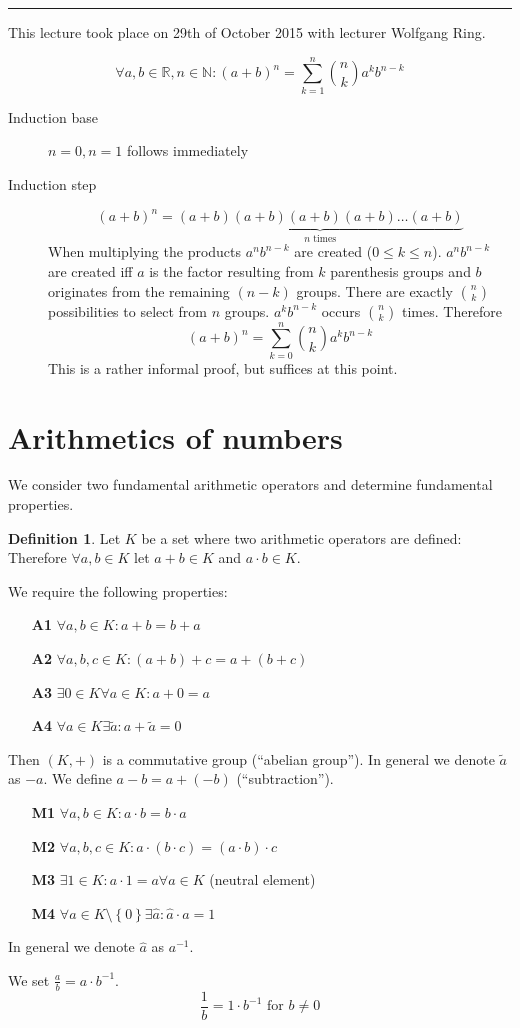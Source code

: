 \documentclass[a4paper,landscape,twocolumn]{article}
\theoremstyle{definition}
\newtheorem{defi}{Definition}
\newcommand\set[1]{\left\{#1\right\}}
\newcommand\meta[3]{\hrule{} This #1 took place on #2 with lecturer #3.\par}
\begin{document}
\meta{lecture}{29th of October 2015}{Wolfgang Ring}

\[ \forall a, b \in \mathbb{R}, n \in \mathbb{N}: (a + b)^n = \sum_{k=1}^n \binom{n}{k} a^k b^{n-k}  \]
\begin{description}
  \item[Induction base] $n = 0, n = 1$ follows immediately
  \item[Induction step]
    \[ (a + b)^n = \underbrace{(a + b)(a + b)(a + b)(a + b)\dots(a + b)}_{n \text{ times}} \]
    When multiplying the products $a^n b^{n-k}$ are created ($0 \leq k \leq n$).
    $a^n b^{n-k}$ are created iff $a$ is the factor resulting from $k$ parenthesis groups and
    $b$ originates from the remaining $(n-k)$ groups.
    There are exactly $\binom{n}{k}$ possibilities to select from $n$ groups.
    $a^k b^{n-k}$ occurs $\binom nk$ times.
    Therefore
    \[ (a + b)^n = \sum_{k=0}^n \binom nk a^k b^{n-k} \]
    This is a rather informal proof, but suffices at this point.
\end{description}

\section{Arithmetics of numbers}
%
We consider two fundamental arithmetic operators and determine fundamental properties.

\begin{defi}
  Let $K$ be a set where two arithmetic operators are defined:
  Therefore $\forall a,b \in K$ let $a + b \in K$ and $a \cdot b \in K$.

  We require the following properties:
  \begin{itemize}
    \item[\textbf{A1}] $\forall a,b \in K: a + b = b + a$
    \item[\textbf{A2}] $\forall a,b,c \in K: (a + b) + c = a + (b + c)$
    \item[\textbf{A3}] $\exists 0 \in K \forall a \in K: a + 0 = a$
    \item[\textbf{A4}] $\forall a \in K \exists \tilde{a}: a + \tilde{a} = 0$
  \end{itemize}
  Then $(K, +)$ is a commutative group (\enquote{abelian group}).
  In general we denote $\tilde{a}$ as $-a$.
  We define $a - b = a + (-b)$ (\enquote{subtraction}).

  \begin{itemize}
    \item[\textbf{M1}] $\forall a,b \in K: a \cdot b = b \cdot a$
    \item[\textbf{M2}] $\forall a,b,c \in K: a \cdot (b \cdot c) = (a \cdot b) \cdot c$
    \item[\textbf{M3}] $\exists 1 \in K: a \cdot 1 = a \forall a \in K$ (neutral element)
    \item[\textbf{M4}] $\forall a \in K \setminus \set{0} \exists \hat a: \hat a \cdot a = 1$
  \end{itemize}
  In general we denote $\hat a$ as $a^{-1}$.

  We set $\frac ab = a \cdot b^{-1}$.
  \[ \frac{1}{b} = 1 \cdot b^{-1} \text{ for } b \neq 0 \]
\end{defi}
\end{document}
